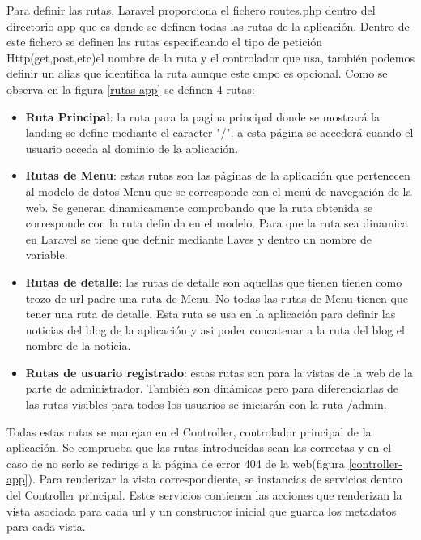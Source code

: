 \vspace{5 mm}

Para definir las rutas, Laravel proporciona el fichero routes.php dentro del directorio app que es donde se definen todas las rutas de la aplicación. Dentro de este fichero se definen las rutas especificando el tipo de petición Http(get,post,etc)el nombre de la ruta y el controlador que usa, también podemos definir un alias que identifica la ruta aunque este cmpo es opcional. Como se observa en la figura \ref{rutas-app} se definen 4 rutas:

\begin{itemize}

\item \textbf{Ruta Principal}: la ruta para la pagina principal donde se mostrará la landing se define mediante el caracter "/". a esta página se accederá cuando el usuario acceda al dominio de la aplicación.

\item \textbf{Rutas de Menu}: estas rutas son las páginas de la aplicación que pertenecen al modelo de datos Menu que se corresponde con el menú de navegación de la web. Se generan dinamicamente comprobando que la ruta obtenida se corresponde con la ruta definida en el modelo. Para que la ruta sea dinamica en Laravel se tiene que definir mediante llaves y dentro un nombre de variable.

\item \textbf{Rutas de detalle}: las rutas de detalle son aquellas que tienen tienen como trozo de url padre una ruta de Menu. No todas las rutas de Menu tienen que tener una ruta de detalle. Esta ruta se usa en la aplicación para definir las noticias del blog de la aplicación y asi poder concatenar a la ruta del blog el nombre de la noticia.

\item \textbf{Rutas de usuario registrado}: estas rutas son para la vistas de la web de la parte de administrador. También son dinámicas pero para diferenciarlas de las rutas visibles para todos los usuarios se iniciarán con la ruta /admin.


\end{itemize} 


Todas estas rutas se manejan en el Controller, controlador principal de la aplicación. Se comprueba que las rutas introducidas sean las correctas y en el caso de no serlo se redirige a la página de error 404 de la web(figura \ref{controller-app}). Para renderizar la vista correspondiente, se instancias de servicios dentro del Controller principal. Estos servicios contienen las acciones que renderizan la vista asociada para cada url y un constructor inicial que guarda los metadatos para cada vista.

